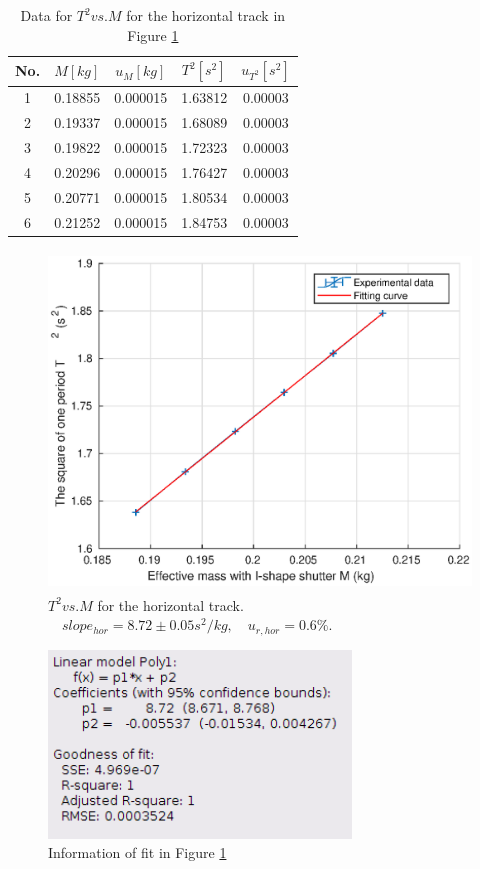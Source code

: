     \begin{table}[h] \small
        \centering
        \begin{tabular}{|c|c|c|c|c|}
            \hline
            No. & $M[kg]$ & $u_{M}[kg]$ & $T^2[s^2]$ & $u_{T^2}[s^2]$\\ \hline
            1 & 0.18855 & 0.000015 & 1.63812 & 0.00003\\ \hline
            2 & 0.19337 & 0.000015 & 1.68089 & 0.00003\\ \hline
            3 & 0.19822 & 0.000015 & 1.72323 & 0.00003\\ \hline
            4 & 0.20296 & 0.000015 & 1.76427 & 0.00003\\ \hline
            5 & 0.20771 & 0.000015 & 1.80534 & 0.00003\\ \hline
            6 & 0.21252 & 0.000015 & 1.84753 & 0.00003\\ \hline
        \end{tabular}
        \caption{Data for $T^2 vs. M$ for the horizontal track in Figure \ref{tm}}\label{tmdata}
    \end{table}
    \begin{figure}[!h]
        \centering    
        \includegraphics[height=9cm]{images/tm.eps}     
        \caption{$T^2 vs. M$ for the horizontal track.$\quad slope_{hor}=8.72\pm 0.05s^2/kg,\quad u_{r,hor}=0.6\%.$}\label{tm}
    \end{figure}
    \begin{figure}[!h]
        \centering
        \includegraphics[height=5cm]{images/tminfo.png}
        \caption{Information of fit in Figure \ref{tm}}\label{tminfo}
    \end{figure}
